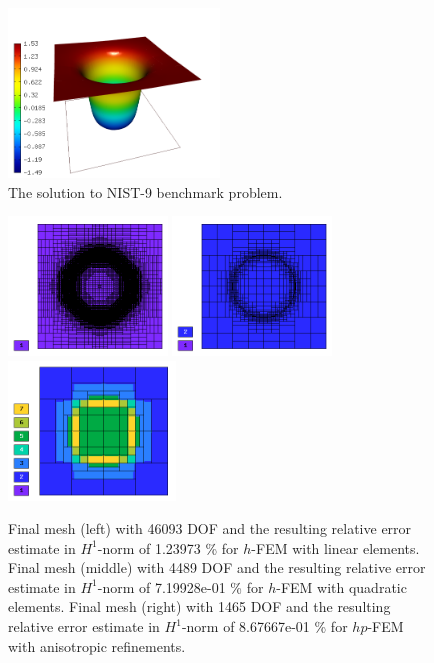 \documentclass[12pt]{elsarticle}
\begin{document}
\begin{figure}[H]
\centering
\includegraphics[height=4.5cm]{nist/nist-9/solution.png}
\caption{The solution to NIST-9 benchmark problem.}
\label{fig:sln-nist09}
\end{figure}

\begin{figure}[H]
\centering
\includegraphics[height=3.7cm]{nist/nist-9/mesh_h1_aniso.png}
\includegraphics[height=3.7cm]{nist/nist-9/mesh_h2_aniso.png}
\includegraphics[height=3.7cm]{nist/nist-9/mesh_hp_aniso.png}
\caption{
Final mesh (left) with 46093 DOF and the resulting
relative error estimate in $H^1$-norm of 1.23973 \% for $h$-FEM with linear elements.
Final mesh (middle) with 4489 DOF and the resulting
relative error estimate in $H^1$-norm of 7.19928e-01 \% for $h$-FEM with quadratic elements.
Final mesh (right) with 1465 DOF and the resulting
relative error estimate in $H^1$-norm of 8.67667e-01 \% for $hp$-FEM with anisotropic refinements.}
\label{fig:nist-9-hp-aniso}
\end{figure}
\end{document}
